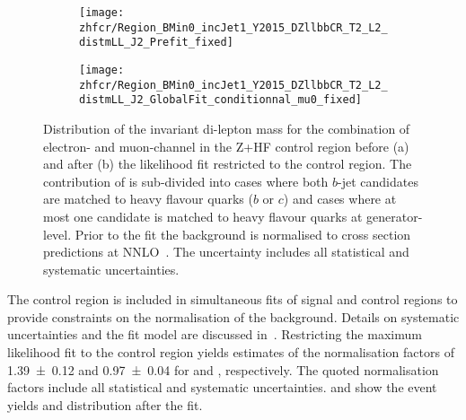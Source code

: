 \begin{figure}[htbp]
  \centering


  \begin{subfigure}{.485\textwidth}
    \texttt{[image: zhfcr/Region\_BMin0\_incJet1\_Y2015\_DZllbbCR\_T2\_L2\_distmLL\_J2\_Prefit\_fixed]}
    \label{fig:zcr_mll_prefit}
  \end{subfigure}\hfill%
  \begin{subfigure}{.485\textwidth}
    \texttt{[image: zhfcr/Region\_BMin0\_incJet1\_Y2015\_DZllbbCR\_T2\_L2\_distmLL\_J2\_GlobalFit\_conditionnal\_mu0\_fixed]}
    \label{fig:zcr_mll_postfit}
  \end{subfigure}

  \caption{Distribution of the invariant di-lepton mass for the
    combination of electron- and muon-channel in the Z+HF control
    region before (a) and after (b) the likelihood fit restricted to
    the control region. The contribution of \Zjets is sub-divided into
    cases where both $b$-jet candidates are matched to heavy flavour
    quarks ($b$ or $c$) and cases where at most one candidate is
    matched to heavy flavour quarks at generator-level. Prior to the
    fit the \Zjets background is normalised to cross section
    predictions at NNLO~\cite{Anastasiou:2003ds}. The uncertainty
    includes all statistical and systematic uncertainties.}
\end{figure}

The \ZHF control region is included in simultaneous fits of signal and
control regions to provide constraints on the normalisation of the
\ZHF background. Details on systematic uncertainties and the fit model
are discussed
in~. Restricting the
maximum likelihood fit to the control region yields estimates of the
normalisation factors of \num{1.39 \pm 0.12} and \num{0.97 \pm 0.04}
for \ZHF and \ttbar, respectively. The quoted normalisation factors
include all statistical and systematic
uncertainties.  and 
show the event yields and \mll distribution after the fit.




